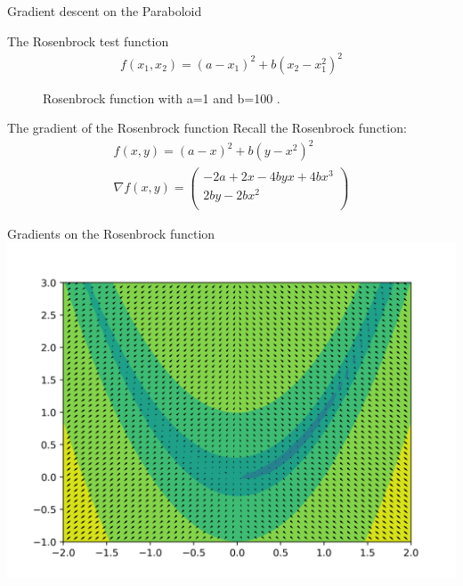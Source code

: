 \documentclass[notes]{beamer}
\begin{document}
    \begin{frame}{Gradient descent on the Paraboloid}
      \centering
    \end{frame}

    \begin{frame}{The Rosenbrock test function}
      \begin{align}
        f(x_1, x_2) = (a - x_1)^2 + b(x_2 - x_1^2)^2
      \end{align}
      \begin{figure}
        
        \caption{Rosenbrock function with a=1 and b=100 .}
      \end{figure}
    \end{frame}

    \begin{frame}{The gradient of the Rosenbrock function}
      Recall the Rosenbrock function:
      \begin{align}
        f(x, y) = (a - x)^2 + b(y - x^2)^2 \\
        \nabla f(x, y) = \begin{pmatrix}
          -2a + 2x - 4byx + 4bx^3 \\
          2by - 2bx^2 \\
        \end{pmatrix}
      \end{align}
    \end{frame}

    \begin{frame}{Gradients on the Rosenbrock function}
      \includegraphics[width=.9\linewidth]{./figures/quiver.png}
    \end{frame}
\end{document}
